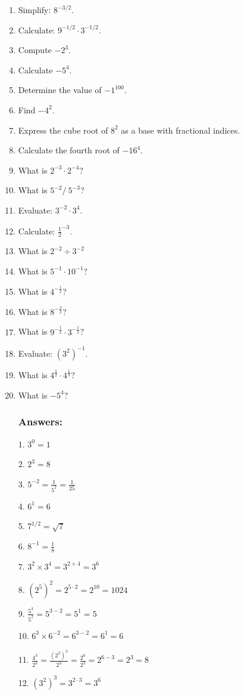 \documentclass{article}
\begin{document}
\begin{enumerate}
\item Simplify: $8^{-3/2}$.
\item Calculate: $9^{-1/2} \cdot 3^{-1/2}$.
\item Compute $-2^3$.
\item Calculate $-5^4$.
\item Determine the value of $-1^{100}$.
\item Find $-4^2$.
\item Express the cube root of $8^2$ as a base with fractional indices.
\item Calculate the fourth root of $-16^4$.
\item What is $2^{-3} \cdot 2^{-4}$?
\item What is $5^{-2} / \ 5^{-3}$?
\item Evaluate: $3^{-2} \cdot 3^4$.
\item Calculate: $\frac{1}{2}^{-3}$.
\item What is $2^{-2}\div3^{-2}$
\item What is $5^{-1} \cdot 10^{-1}$?
\item What is $4^{-\frac{1}{2}}$?
\item What is $8^{-\frac{3}{2}}$?
\item What is $9^{-\frac{1}{2}} \cdot 3^{-\frac{1}{2}}$?
\item Evaluate: $(3^2)^{−1}$.
\item What is $4^{\frac{1}{2}}\cdot4^{\frac{1}{3}}$?
\item What is $-5^4$?

\subsubsection*{Answers:}
1. $3^0 = 1$

2. $2^3 = 8$

3. $5^{-2} = \frac{1}{5^2} = \frac{1}{25}$

4. $6^1 = 6$

5. $7^{1/2} = \sqrt{7}$

6. $8^{-1} = \frac{1}{8}$

7. $3^2 \times 3^4 = 3^{2+4} = 3^6$

8. $(2^5)^2 = 2^{5 \cdot 2} = 2^{10} = 1024$

9. $\frac{5^3}{5^2} = 5^{3-2} = 5^1 = 5$

10. $6^3 \times 6^{-2} = 6^{3-2} = 6^1 = 6$

11. $\frac{4^3}{2^3} = \frac{(2^2)^3}{2^3}=\frac{2^6}{2^3}=2^{6-3}=2^3=8$

12. $(3^2)^3 = 3^{2 \cdot 3} = 3^6$


\end{enumerate}
\end{document}
